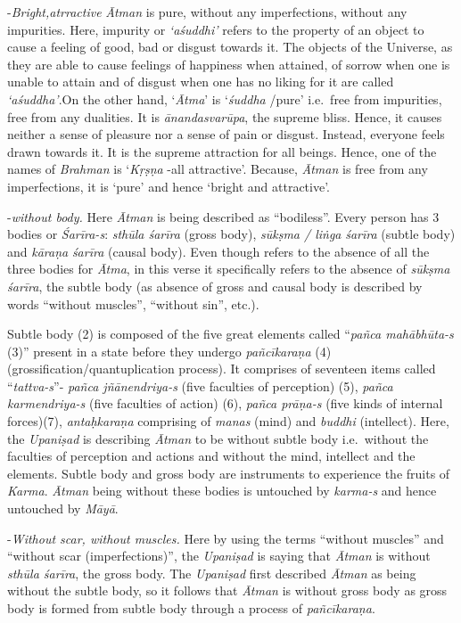 -\emph{Bright,atrractive} \emph{Ātman} is pure, without any imperfections, without any impurities. Here, impurity or \emph{`aśuddhi'} refers to the property of an object to cause a feeling of good, bad or disgust towards it. The objects of the Universe, as they are able to cause feelings of happiness when attained, of sorrow when one is unable to attain and of disgust when one has no liking for it are called \emph{`aśuddha'}.On the other hand, `\emph{Ātma}' is `\emph{śuddha} /pure' i.e.\ free from impurities, free from any dualities. It is \emph{ānandasvarūpa}, the supreme bliss. Hence, it causes neither a sense of pleasure nor a sense of pain or disgust. Instead, everyone feels drawn towards it. It is the supreme attraction for all beings. Hence, one of the names of \emph{Brahman} is `\emph{Kṛṣṇa} -all attractive'. Because, \emph{Ātman} is free from any imperfections, it is `pure' and hence `bright and attractive'.
\vskip 1.5pt

-\emph{without body.} Here \emph{Ātman} is being described as ``bodiless''. Every person has 3 bodies or \emph{Śarīra-s}: \emph{sthūla śarīra} (gross body), \emph{sūkṣma / liṅga} \emph{śarīra} (subtle body) and \emph{kāraṇa} \emph{śarīra} (causal body). Even though  refers to the absence of all the three bodies for \emph{Ātma}, in this verse it specifically refers to the absence of \emph{sūkṣma śarīra}, the subtle body (as absence of gross and causal body is described by words ``without muscles'', ``without sin'', etc.).
\vskip 1.5pt

Subtle body (2) is composed of the five great elements called ``\emph{pañca mahābhūta-s} (3)'' present in a state before they undergo \emph{pañcīkaraṇa} (4) (grossification/quantuplication process). It comprises of seventeen items called ``\emph{tattva-s}''- \emph{pañca jñānendriya-s} (five faculties of perception) (5), \emph{pañca karmendriya-s} (five faculties of action) (6), \emph{pañca prāṇa-s} (five kinds of internal forces)(7), \emph{antaḥkaraṇa} comprising of \emph{manas} (mind) and \emph{buddhi} (intellect). Here, the \emph{Upaniṣad} is describing \emph{Ātman} to be without subtle body i.e.\ without the faculties of perception and actions and without the mind, intellect and the elements. Subtle body and gross body are instruments to experience the fruits of \emph{Karma}. \emph{Ātman} being without these bodies is untouched by \emph{karma-s} and hence untouched by \emph{Māyā}.
\vskip 1.5pt

-\emph{Without scar, without muscles.} Here by using the terms ``without muscles'' and ``without scar (imperfections)'', the \emph{Upaniṣad} is saying that \emph{Ātman} is without \emph{sthūla śarīra}, the gross body. The \emph{Upaniṣad} first described \emph{Ātman} as being without the subtle body, so it follows that \emph{Ātman} is without gross body as gross body is formed from subtle body through a process of \emph{pañcīkaraṇa}.

